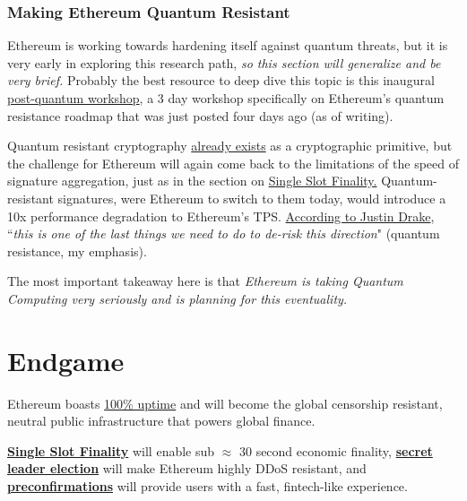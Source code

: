 \documentclass[12pt]{article}
\begin{document}
\subsubsection{Making Ethereum Quantum Resistant}
\label{Making Ethereum Quantum Resistant}

Ethereum is working towards hardening itself against quantum threats, but it is very early in exploring this research path, \textit{so this section will generalize and be very brief.} Probably the best resource to deep dive this topic is this inaugural \href{https://www.youtube.com/watch?v=g-PDKIAqw-A&list=PLJqWcTqh_zKGPctGzVOBllZnCPQj-g7d3}{post-quantum workshop}, a 3 day workshop specifically on Ethereum's quantum resistance roadmap that was just posted four days ago (as of writing). 

Quantum resistant cryptography \href{https://en.wikipedia.org/wiki/Post-quantum_cryptography}{already exists} as a cryptographic primitive, but the challenge for Ethereum will again come back to the limitations of the speed of signature aggregation, just as in the section on \hyperref[Single Slot Finality]{Single Slot Finality.} Quantum-resistant signatures, were Ethereum to switch to them today, would introduce a 10x performance degradation to Ethereum's TPS. \href{https://youtu.be/g-PDKIAqw-A?si=uYvITr67sQnTHISe&t=887}{According to Justin Drake}, ``\textit{this is one of the last things we need to do to de-risk this direction}" (quantum resistance, my emphasis). 

The most important takeaway here is that \textit{Ethereum is taking Quantum Computing very seriously and is planning for this eventuality.} 

\clearpage

\section{Endgame}

Ethereum boasts \href{https://ethereumuptime.org/}{100\% uptime} and will become the global censorship resistant, neutral public infrastructure that powers global finance. 

\hyperref[Single Slot Finality]{\textbf{Single Slot Finality}} will enable sub $\approx$ 30 second economic finality, \hyperref[Single Secret Leader Election]{\textbf{secret leader election}} will make Ethereum highly DDoS resistant, and \hyperref[Preconfirmations]{\textbf{preconfirmations}} will provide users with a fast, fintech-like experience. 
\end{document}
